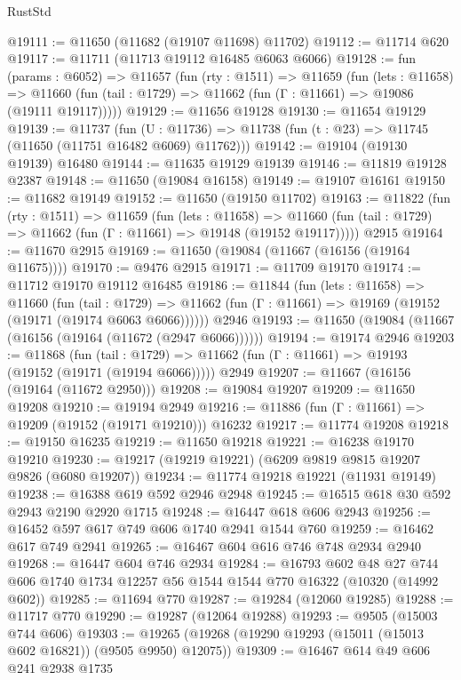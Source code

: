 \begin{lexlean}{RustStd}
\begin{coremodule}
@19111 := @11650 (@11682 (@19107 @11698) @11702)
@19112 := @11714 @620
@19117 := @11711 (@11713 @19112 @16485 @6063 @6066)
@19128 := fun (params : @6052) =>
  @11657
    (fun (rty : @1511) =>
    @11659
      (fun (lets : @11658) =>
      @11660 (fun (tail : @1729) => @11662 (fun (Γ : @11661) => @19086 (@19111 @19117)))))
@19129 := @11656 @19128
@19130 := @11654 @19129
@19139 := @11737
    (fun (U : @11736) => @11738 (fun (t : @23) => @11745 (@11650 (@11751 @16482 @6069) @11762)))
@19142 := @19104 (@19130 @19139) @16480
@19144 := @11635 @19129 @19139
@19146 := @11819 @19128 @2387
@19148 := @11650 (@19084 @16158)
@19149 := @19107 @16161
@19150 := @11682 @19149
@19152 := @11650 (@19150 @11702)
@19163 := @11822
    (fun (rty : @1511) =>
    @11659
      (fun (lets : @11658) =>
      @11660 (fun (tail : @1729) => @11662 (fun (Γ : @11661) => @19148 (@19152 @19117)))))
    @2915
@19164 := @11670 @2915
@19169 := @11650 (@19084 (@11667 (@16156 (@19164 @11675))))
@19170 := @9476 @2915
@19171 := @11709 @19170
@19174 := @11712 @19170 @19112 @16485
@19186 := @11844
    (fun (lets : @11658) =>
    @11660
      (fun (tail : @1729) =>
      @11662 (fun (Γ : @11661) => @19169 (@19152 (@19171 (@19174 @6063 @6066))))))
    @2946
@19193 := @11650 (@19084 (@11667 (@16156 (@19164 (@11672 (@2947 @6066))))))
@19194 := @19174 @2946
@19203 := @11868
    (fun (tail : @1729) => @11662 (fun (Γ : @11661) => @19193 (@19152 (@19171 (@19194 @6066)))))
    @2949
@19207 := @11667 (@16156 (@19164 (@11672 @2950)))
@19208 := @19084 @19207
@19209 := @11650 @19208
@19210 := @19194 @2949
@19216 := @11886 (fun (Γ : @11661) => @19209 (@19152 (@19171 @19210))) @16232
@19217 := @11774 @19208
@19218 := @19150 @16235
@19219 := @11650 @19218
@19221 := @16238 @19170 @19210
@19230 := @19217 (@19219 @19221) (@6209 @9819 @9815 @19207 @9826 (@6080 @19207))
@19234 := @11774 @19218 @19221 (@11931 @19149)
@19238 := @16388 @619 @592 @2946 @2948
@19245 := @16515 @618 @30 @592 @2943 @2190 @2920 @1715
@19248 := @16447 @618 @606 @2943
@19256 := @16452 @597 @617 @749 @606 @1740 @2941 @1544 @760
@19259 := @16462 @617 @749 @2941
@19265 := @16467 @604 @616 @746 @748 @2934 @2940
@19268 := @16447 @604 @746 @2934
@19284 := @16793
    @602
    @48
    @27
    @744
    @606
    @1740
    @1734
    @12257
    @56
    @1544
    @1544
    @770
    @16322
    (@10320 (@14992 @602))
@19285 := @11694 @770
@19287 := @19284 (@12060 @19285)
@19288 := @11717 @770
@19290 := @19287 (@12064 @19288)
@19293 := @9505 (@15003 @744 @606)
@19303 := @19265 (@19268 (@19290 @19293 (@15011 (@15013 @602 @16821)) (@9505 @9950) @12075))
@19309 := @16467 @614 @49 @606 @241 @2938 @1735

\end{coremodule}
\end{lexlean}
